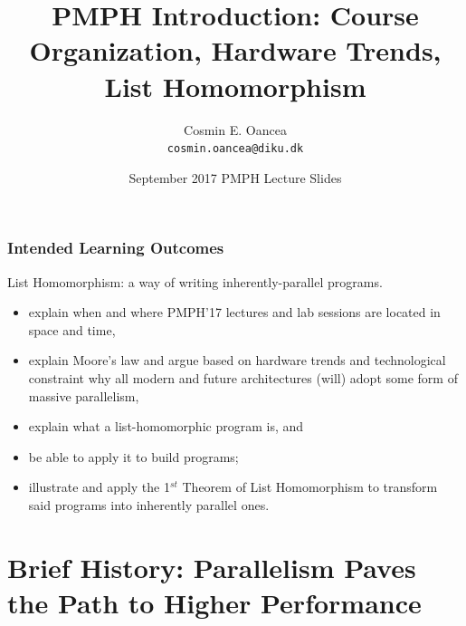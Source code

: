 \documentclass{beamer}
\title[Intro]{PMPH Introduction: Course Organization, Hardware Trends, List Homomorphism}
\author[C.~Oancea]{Cosmin E. Oancea\\{\tt cosmin.oancea@diku.dk}}
\institute{Department of Computer Science (DIKU)\\University of Copenhagen}
\date[Sept 2017]{September 2017 PMPH Lecture Slides}
\begin{document}
\titleslide




\begin{frame}[fragile,t]
\frametitle{Intended Learning Outcomes}

List Homomorphism: a way of writing inherently-parallel programs.
\bigskip

\begin{itemize}
    \item explain when and where PMPH'17 lectures and lab sessions 
            are located in space and time, \bigskip

    \item explain Moore's law and argue based on hardware trends 
            and technological constraint
            why all modern and future architectures (will)
            adopt some form of massive parallelism,\bigskip

    \item explain what a list-homomorphic program is, and 
    \item be able to apply it to build programs;
    \item illustrate and apply the 1$^{st}$ Theorem of List Homomorphism 
                to transform said programs into inherently parallel ones.
\end{itemize}
\end{frame}


\begin{frame}[fragile]
	\tableofcontents
\end{frame}

\section{Brief History: Parallelism Paves the Path to Higher Performance}
\end{document}
